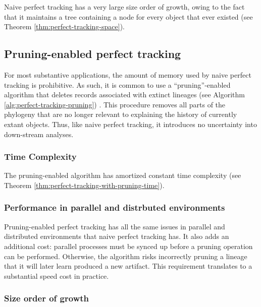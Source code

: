 Naive perfect tracking has a very large size order of growth, owing to the fact that it maintains a tree containing a node for every object that ever existed (see Theorem \ref{thm:perfect-tracking-space}).



\subsection{Pruning-enabled perfect tracking}
\label{sec:naive-perfect-tracking-with-pruning}

For most substantive applications, the amount of memory used by naive perfect tracking is prohibitive.
As such, it is common to use a ``pruning''-enabled algorithm that deletes records associated with extinct lineages (see Algorithm \ref{alg:perfect-tracking-pruning}) \citep{dolson2023phylotrackpy}.
This procedure removes all parts of the phylogeny that are no longer relevant to explaining the history of currently extant objects.
Thus, like naive perfect tracking, it introduces no uncertainty into down-stream analyses.



\subsubsection{Time Complexity}

The pruning-enabled algorithm has amortized constant time complexity (see Theorem \ref{thm:perfect-tracking-with-pruning-time}).



\subsubsection{Performance in parallel and distrbuted environments}
\label{sec:perfect-tracking-pruning-distrbuted}
Pruning-enabled perfect tracking has all the same issues in parallel and distributed environments that naive perfect tracking has.
It also adds an additional cost: parallel processes must be synced up before a pruning operation can be performed.
Otherwise, the algorithm risks incorrectly pruning a lineage that it will later learn produced a new artifact.
This requirement translates to a substantial speed cost in practice.


\subsubsection{Size order of growth}
\label{sec:perfect-tracking-pruning-space}

